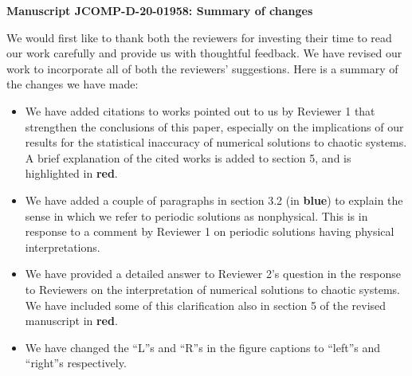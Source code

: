 \documentclass[11pt]{article}
\title{}
\author{}
\date{23rd April 2021}
\newcommand{\reviewerOne}[1]{{\color{burgundy}\textbf{#1}}}
\newcommand{\reviewerTwo}[1]{{\color{azure}\textbf{#1}}}
\begin{document}
\begin{center}
		\Large{\textbf{Manuscript JCOMP-D-20-01958: Summary of changes}}
\end{center}
\medskip
We would first like to thank both the reviewers for investing their time to read our work carefully and provide us with thoughtful feedback. We have revised our work to incorporate all of both the reviewers' suggestions. Here is a summary of the changes we have made:
\begin{itemize}
    \item We have added citations to works pointed out to us by Reviewer 1 that strengthen the conclusions of this paper, especially on the implications of our results for the statistical inaccuracy of numerical solutions to chaotic systems. A brief explanation of the cited works is added to section 5, and is highlighted in \reviewerOne{red}.
    \item We have added a couple of paragraphs in section 3.2 (in \reviewerOne{blue}) to explain the sense in which we refer to periodic solutions as nonphysical. This is in response to a comment by Reviewer 1 on periodic solutions having physical interpretations.
    \item We have provided a detailed answer to Reviewer 2's question in the response to Reviewers on the interpretation of numerical solutions to chaotic systems. We have included some of this clarification also in section 5 of the revised manuscript in \reviewerTwo{red}.
    \item We have changed the ``L''s and ``R''s in the figure captions to ``left''s and ``right''s respectively.
\end{itemize}
\end{document}
